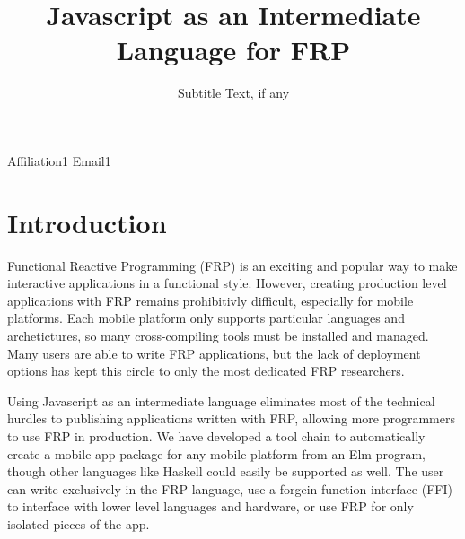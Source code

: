 \documentclass[preprint]{sigplanconf}
\begin{document}
\setlength{\pdfpageheight}{\paperheight}
\setlength{\pdfpagewidth}{\paperwidth}






\title{Javascript as an Intermediate Language for FRP}
\subtitle{Subtitle Text, if any}

           {Affiliation1}
           {Email1}

\maketitle

\section{Introduction}

Functional Reactive Programming (FRP) is an exciting and popular way to make interactive applications in a functional style.
However, creating production level applications with FRP remains prohibitivly difficult, especially for mobile platforms.
Each mobile platform only supports particular languages and archetictures, so many cross-compiling tools must be installed and managed.
Many users are able to write FRP applications, but the lack of deployment options has kept this circle to only the most dedicated FRP researchers.

Using Javascript as an intermediate language eliminates most of the technical hurdles to publishing applications written with FRP, allowing more programmers to use FRP in production.
We have developed a tool chain to automatically create a mobile app package for any mobile platform from an Elm program, though other languages like Haskell could easily be supported as well.
The user can write exclusively in the FRP language, use a forgein function interface (FFI) to interface with lower level languages and hardware, or use FRP for only isolated pieces of the app.
\end{document}
